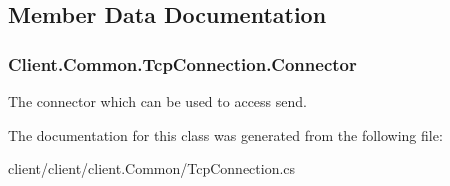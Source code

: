 \subsection{Member Data Documentation}
\hypertarget{classClient_1_1Common_1_1TcpConnection_a5522f2e8a44ff38a38844642920d6b7d}{}
\subsubsection[{Connector}]{ Client.\+Common.\+Tcp\+Connection.\+Connector\hspace{0.3cm}{\ttfamily [static]}}\label{classClient_1_1Common_1_1TcpConnection_a5522f2e8a44ff38a38844642920d6b7d}


The connector which can be used to access send. 



The documentation for this class was generated from the following file\+:\begin{DoxyCompactItemize}
\item 
client/client/client.\+Common/Tcp\+Connection.\+cs\end{DoxyCompactItemize}
